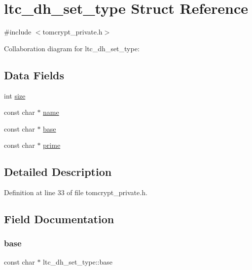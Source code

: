 \hypertarget{structltc__dh__set__type}{}\section{ltc\+\_\+dh\+\_\+set\+\_\+type Struct Reference}
\label{structltc__dh__set__type}


{\ttfamily \#include $<$tomcrypt\+\_\+private.\+h$>$}



Collaboration diagram for ltc\+\_\+dh\+\_\+set\+\_\+type\+:
\subsection*{Data Fields}
\begin{DoxyCompactItemize}
\item 
int \mbox{\hyperlink{structltc__dh__set__type_a2b9cb28186fe61b5f2c86195af6fb397}{size}}
\item 
const char $\ast$ \mbox{\hyperlink{structltc__dh__set__type_ac610a2795fa141eb47c6bc75db1f100d}{name}}
\item 
const char $\ast$ \mbox{\hyperlink{structltc__dh__set__type_a36eaf483f7dfc52c1798cf80f9a8cef4}{base}}
\item 
const char $\ast$ \mbox{\hyperlink{structltc__dh__set__type_a075dd36bc203e54e802194a7a0ac4d0a}{prime}}
\end{DoxyCompactItemize}


\subsection{Detailed Description}


Definition at line 33 of file tomcrypt\+\_\+private.\+h.



\subsection{Field Documentation}
\mbox{\label{structltc__dh__set__type_a36eaf483f7dfc52c1798cf80f9a8cef4}} 
\subsubsection{\texorpdfstring{base}{base}}
{\footnotesize\ttfamily const char $\ast$ ltc\+\_\+dh\+\_\+set\+\_\+type\+::base}



